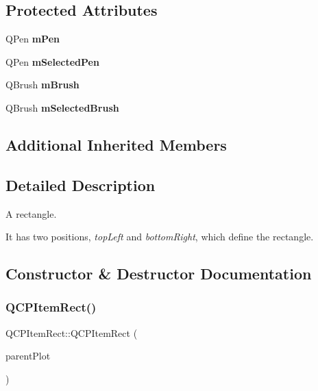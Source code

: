 \subsection*{Protected Attributes}
\begin{DoxyCompactItemize}
\item 
\mbox{\label{class_q_c_p_item_rect_aa0d49323628d6752026056bfb52afd86}} 
Q\+Pen {\bfseries m\+Pen}
\item 
\mbox{\label{class_q_c_p_item_rect_a73cc0bee61de3c67221ec8c7a76a29ed}} 
Q\+Pen {\bfseries m\+Selected\+Pen}
\item 
\mbox{\label{class_q_c_p_item_rect_a2d7f207fada27588b3a52b19234d3c2e}} 
Q\+Brush {\bfseries m\+Brush}
\item 
\mbox{\label{class_q_c_p_item_rect_a21b70eee59b6e19ae0bbdf037b13508f}} 
Q\+Brush {\bfseries m\+Selected\+Brush}
\end{DoxyCompactItemize}
\subsection*{Additional Inherited Members}


\subsection{Detailed Description}
A rectangle. 

 It has two positions, {\itshape top\+Left} and {\itshape bottom\+Right}, which define the rectangle. 

\subsection{Constructor \& Destructor Documentation}
\mbox{\label{class_q_c_p_item_rect_a412ad1579f7a1fba453d0fa28c496cbc}} 
\subsubsection{\texorpdfstring{Q\+C\+P\+Item\+Rect()}{QCPItemRect()}}
{\footnotesize\ttfamily Q\+C\+P\+Item\+Rect\+::\+Q\+C\+P\+Item\+Rect (\begin{DoxyParamCaption}\item[{\mbox{\hyperlink{class_q_custom_plot}{Q\+Custom\+Plot}} $\ast$}]{parent\+Plot }\end{DoxyParamCaption})\hspace{0.3cm}{\ttfamily [explicit]}}


